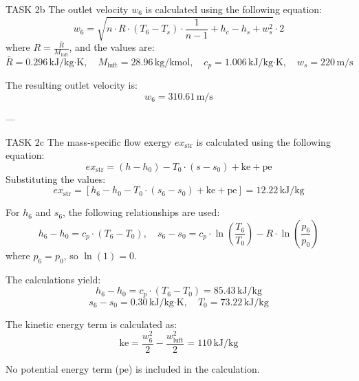 TASK 2b  
The outlet velocity \( w_6 \) is calculated using the following equation:  
\[
w_6 = \sqrt{n \cdot R \cdot (T_6 - T_s) \cdot \frac{1}{n-1} + h_c - h_s + w_s^2} \cdot 2
\]  
where \( R = \frac{\bar{R}}{M_{\text{luft}}} \), and the values are:  
\[
\bar{R} = 0.296 \, \text{kJ/kg·K}, \quad M_{\text{luft}} = 28.96 \, \text{kg/kmol}, \quad c_p = 1.006 \, \text{kJ/kg·K}, \quad w_s = 220 \, \text{m/s}
\]  

The resulting outlet velocity is:  
\[
w_6 = 310.61 \, \text{m/s}
\]  

---

TASK 2c  
The mass-specific flow exergy \( ex_{\text{str}} \) is calculated using the following equation:  
\[
ex_{\text{str}} = (h - h_0) - T_0 \cdot (s - s_0) + \text{ke} + \text{pe}
\]  
Substituting the values:  
\[
ex_{\text{str}} = [h_6 - h_0 - T_0 \cdot (s_6 - s_0) + \text{ke} + \text{pe}] = 12.22 \, \text{kJ/kg}
\]  

For \( h_6 \) and \( s_6 \), the following relationships are used:  
\[
h_6 - h_0 = c_p \cdot (T_6 - T_0), \quad s_6 - s_0 = c_p \cdot \ln\left(\frac{T_6}{T_0}\right) - R \cdot \ln\left(\frac{p_6}{p_0}\right)
\]  
where \( p_6 = p_0 \), so \( \ln(1) = 0 \).  

The calculations yield:  
\[
h_6 - h_0 = c_p \cdot (T_6 - T_0) = 85.43 \, \text{kJ/kg}
\]  
\[
s_6 - s_0 = 0.30 \, \text{kJ/kg·K}, \quad T_0 = 73.22 \, \text{kJ/kg}
\]  

The kinetic energy term is calculated as:  
\[
\text{ke} = \frac{w_6^2}{2} - \frac{w_{\text{luft}}^2}{2} = 110 \, \text{kJ/kg}
\]  

No potential energy term (\( \text{pe} \)) is included in the calculation.